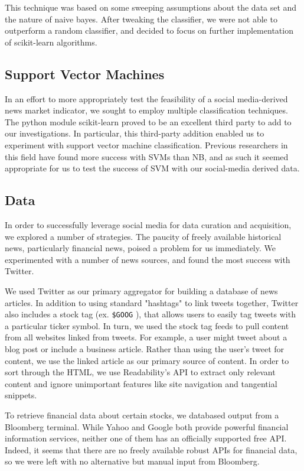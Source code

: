 \documentclass[letterpaper]{article}
\begin{document}
This technique was based on some sweeping assumptions about the data set and the nature of naive bayes.  After tweaking the classifier, we were not able to outperform a random classifier, and decided to focus on further implementation of scikit-learn algorithms.

\subsection{Support Vector Machines}
\noindent In an effort to more appropriately test the feasibility of a social media-derived news market indicator, we sought to employ multiple classification techniques.  The python module scikit-learn proved to be an excellent third party to add to our investigations. In particular, this third-party addition enabled us to experiment with support vector machine classification. Previous researchers in this field have found more success with SVMs than NB, and as such it seemed appropriate for us to test the success of SVM with our social-media derived data.

\subsection{Data}
\noindent In order to successfully leverage social media for data curation and acquisition, we explored a number of strategies. The paucity of freely available historical news, particularly financial news, poised a problem for us immediately.  We experimented with a number of news sources, and found the most success with Twitter.

We used Twitter as our primary aggregator for building a database of news articles. In addition to using standard "hashtags" to link tweets together, Twitter also includes a stock tag (ex. \texttt{\$GOOG} ), that allows users to easily tag tweets with a particular ticker symbol.  In turn, we used the stock tag feeds to pull content from all websites linked from tweets. For example, a user might tweet about a blog post or include a business article. Rather than using the user's tweet for content, we use the linked article as our primary source of content. In order to sort through the HTML, we use Readability's API to extract only relevant content and ignore unimportant features like site navigation and tangential snippets.

To retrieve financial data about certain stocks, we databased output from a Bloomberg terminal. While Yahoo and Google both provide powerful financial information services, neither one of them has an officially supported free API. Indeed, it seems that there are no freely available robust APIs for financial data, so we were left with no alternative but manual input from Bloomberg.
\end{document}
